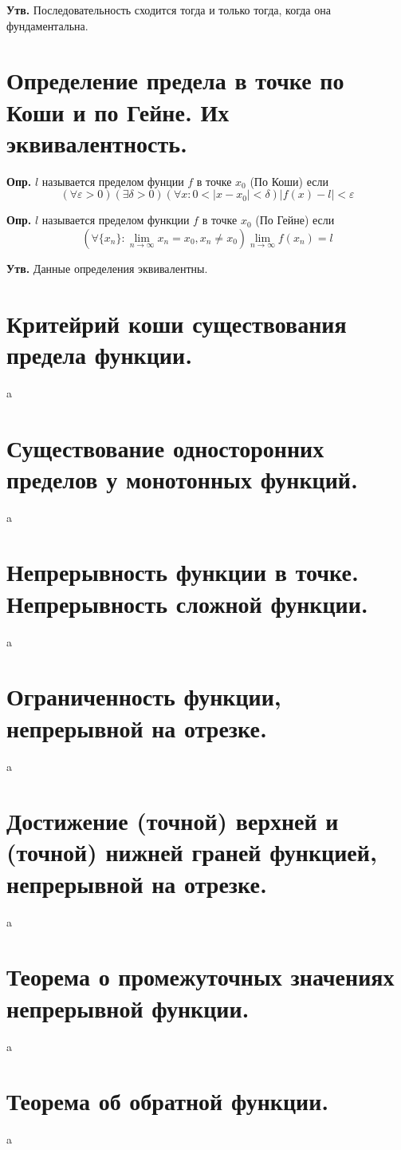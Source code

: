 \documentclass[a4paper,12pt]{article}
\begin{document}
\begin{flushleft}
	\textbf{Утв.} Последовательность сходится тогда и только тогда, когда она фундаментальна.
	
	\section{Определение предела в точке по Коши и по Гейне. Их эквивалентность.}

	\textbf{Опр.} $l$ называется пределом фунции $f$ в точке $x_0$ (По Коши) если $$(\forall \varepsilon > 0) (\exists \delta > 0) (\forall x: 0 < |x - x_0| < \delta) |f(x) - l| < \varepsilon$$
	
	\textbf{Опр.} $l$ называется пределом функции $f$ в точке $x_0$ (По Гейне) если$$(\forall \{x_n\}: \lim_{n \to \infty} x_n = x_0, x_n \neq x_0) \lim_{n \to \infty} f(x_n) = l$$
	
	\textbf{Утв.} Данные определения эквивалентны.
	\section{Критейрий коши существования предела функции.}

	a
	
	\section{Существование односторонних пределов у монотонных функций.}

	a
	
	\section{Непрерывность функции в точке. Непрерывность сложной функции.}

	a
	
	\section{Ограниченность функции, непрерывной на отрезке.}

	a
	
	\section{Достижение (точной) верхней и (точной) нижней граней функцией, непрерывной на отрезке.}

	a
	
	\section{Теорема о промежуточных значениях непрерывной функции.}

	a
	
	\section{Теорема об обратной функции.}

	a

\end{flushleft}
\end{document}
